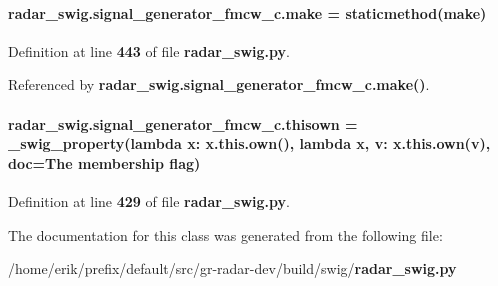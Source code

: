 \paragraph[{make}]{\setlength{\rightskip}{0pt plus 5cm}radar\+\_\+swig.\+signal\+\_\+generator\+\_\+fmcw\+\_\+c.\+make = staticmethod(make)\hspace{0.3cm}{\ttfamily [static]}}\label{classradar__swig_1_1signal__generator__fmcw__c_a8aa5a9a3b0d34f71d3788045b9abe797}


Definition at line {\bf 443} of file {\bf radar\+\_\+swig.\+py}.



Referenced by {\bf radar\+\_\+swig.\+signal\+\_\+generator\+\_\+fmcw\+\_\+c.\+make()}.

\paragraph[{thisown}]{\setlength{\rightskip}{0pt plus 5cm}radar\+\_\+swig.\+signal\+\_\+generator\+\_\+fmcw\+\_\+c.\+thisown = {\bf \+\_\+swig\+\_\+property}(lambda x\+: x.\+this.\+own(), lambda {\bf x}, v\+: x.\+this.\+own(v), doc=\textquotesingle{}The membership flag\textquotesingle{})\hspace{0.3cm}{\ttfamily [static]}}\label{classradar__swig_1_1signal__generator__fmcw__c_a42cd59198e12e3ea5bf42ff8a749caec}


Definition at line {\bf 429} of file {\bf radar\+\_\+swig.\+py}.



The documentation for this class was generated from the following file\+:\begin{DoxyCompactItemize}
\item 
/home/erik/prefix/default/src/gr-\/radar-\/dev/build/swig/{\bf radar\+\_\+swig.\+py}\end{DoxyCompactItemize}
